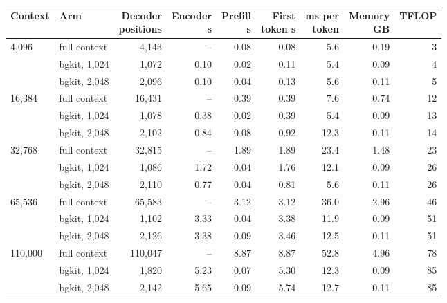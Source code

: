 \begin{tabular}{llrrrrrrr}
\toprule
Context & Arm & \shortstack{Decoder\\positions} & \shortstack{Encoder\\s} & \shortstack{Prefill\\s} & \shortstack{First\\token s} & \shortstack{ms per\\token} & \shortstack{Memory\\GB} & TFLOP \\
\midrule
4,096 & full context & 4,143 & -- & 0.08 & 0.08 & 5.6 & 0.19 & 3 \\
 & bgkit, 1,024 & 1,072 & 0.10 & 0.02 & 0.11 & 5.4 & 0.09 & 4 \\
 & bgkit, 2,048 & 2,096 & 0.10 & 0.04 & 0.13 & 5.6 & 0.11 & 5 \\
\midrule
16,384 & full context & 16,431 & -- & 0.39 & 0.39 & 7.6 & 0.74 & 12 \\
 & bgkit, 1,024 & 1,078 & 0.38 & 0.02 & 0.39 & 5.4 & 0.09 & 13 \\
 & bgkit, 2,048 & 2,102 & 0.84 & 0.08 & 0.92 & 12.3 & 0.11 & 14 \\
\midrule
32,768 & full context & 32,815 & -- & 1.89 & 1.89 & 23.4 & 1.48 & 23 \\
 & bgkit, 1,024 & 1,086 & 1.72 & 0.04 & 1.76 & 12.1 & 0.09 & 26 \\
 & bgkit, 2,048 & 2,110 & 0.77 & 0.04 & 0.81 & 5.6 & 0.11 & 26 \\
\midrule
65,536 & full context & 65,583 & -- & 3.12 & 3.12 & 36.0 & 2.96 & 46 \\
 & bgkit, 1,024 & 1,102 & 3.33 & 0.04 & 3.38 & 11.9 & 0.09 & 51 \\
 & bgkit, 2,048 & 2,126 & 3.38 & 0.09 & 3.46 & 12.5 & 0.11 & 51 \\
\midrule
110,000 & full context & 110,047 & -- & 8.87 & 8.87 & 52.8 & 4.96 & 78 \\
 & bgkit, 1,024 & 1,820 & 5.23 & 0.07 & 5.30 & 12.3 & 0.09 & 85 \\
 & bgkit, 2,048 & 2,142 & 5.65 & 0.09 & 5.74 & 12.7 & 0.11 & 85 \\
\bottomrule
\end{tabular}
